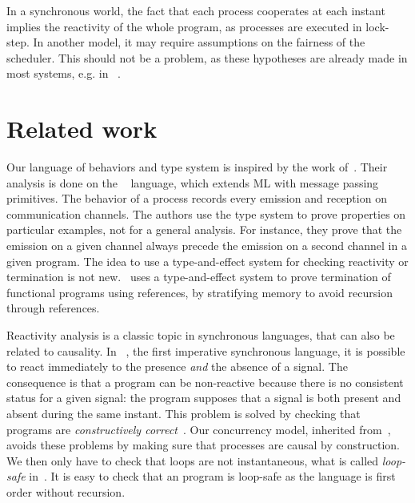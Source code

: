 \documentclass[9pt,preprint]{sigplanconf}
\begin{document}
In a synchronous world, the fact that each process cooperates at each instant implies the reactivity of the whole program, as processes are executed in lock-step. In another model, it may require assumptions on the fairness of the scheduler. This should not be a problem, as these hypotheses are already made in most systems, e.g. in \conhaskell~\cite{Jones:1996}.



\section{Related work}
\label{sec:related_work}


Our language of behaviors and type system is inspired by the work of~\cite{Amtoft:1999}. Their analysis is done on the \cml~\cite{Reppy:2007} language, which extends ML with message passing primitives. The behavior of a process records every emission and reception on communication channels. The authors use the type system to prove properties on particular examples, not for a general analysis. For instance, they prove that the emission on a given channel always precede the emission on a second channel in a given program. The idea to use a type-and-effect system for checking reactivity or termination is not new. \cite{Boudol:2010}~uses a type-and-effect system to prove termination of functional programs using references, by stratifying memory to avoid recursion through references.

Reactivity analysis is a classic topic in synchronous languages, that can also be related to causality. In \esterel~\cite{Berry:1997}, the first imperative synchronous language, it is possible to react immediately to the presence \emph{and} the absence of a signal. The consequence is that a program can be non-reactive because there is no consistent status for a given signal: the program supposes that a signal is both present and absent during the same instant. This problem is solved by checking that programs are \emph{constructively correct}~\cite{Berry:1996}. Our concurrency model, inherited from~\cite{Boussinot:1991}, avoids these problems by making sure that processes are causal by construction. We then only have to check that loops are not instantaneous, what is called \emph{loop-safe} in~\cite{Berry:1996}.  It is easy to check that an \esterel program is loop-safe as the language is first order without recursion. 
\end{document}
